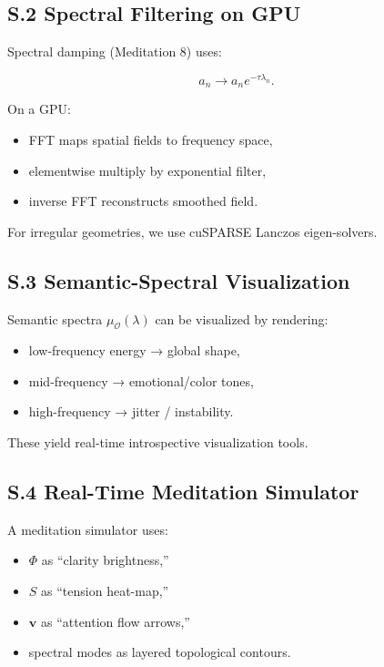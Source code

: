 \documentclass[12pt]{article}
\begin{document}
\subsection*{S.2 Spectral Filtering on GPU}

Spectral damping (Meditation 8) uses:

\[
a_n \to a_n e^{-\tau \lambda_n}.
\]

On a GPU:

\begin{itemize}
\item FFT maps spatial fields to frequency space,
\item elementwise multiply by exponential filter,
\item inverse FFT reconstructs smoothed field.
\end{itemize}

For irregular geometries, we use cuSPARSE Lanczos eigen-solvers.

\subsection*{S.3 Semantic-Spectral Visualization}

Semantic spectra $\mu_{\mathcal O}(\lambda)$ can be visualized by rendering:

\begin{itemize}
\item low-frequency energy → global shape,
\item mid-frequency → emotional/color tones,
\item high-frequency → jitter / instability.
\end{itemize}

These yield real-time introspective visualization tools.

\subsection*{S.4 Real-Time Meditation Simulator}

A meditation simulator uses:

\begin{itemize}
\item $\Phi$ as “clarity brightness,”
\item $S$ as “tension heat-map,”
\item $\mathbf{v}$ as “attention flow arrows,”
\item spectral modes as layered topological contours.
\end{itemize}
\end{document}
